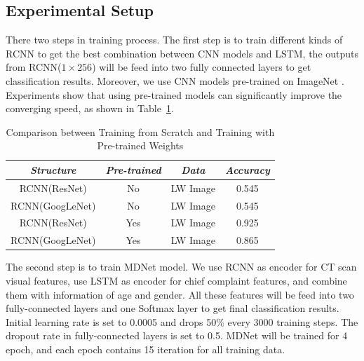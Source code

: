 \documentclass[journal]{IEEEtran}
\begin{document}
\subsection{Experimental Setup}
\label{experimentalsetup}
There two steps in training process.
The first step is to train different kinds of RCNN to get the best combination between CNN models and LSTM, the outputs from RCNN($1 \times 256$) will be feed into two fully connected layers to get classification results. Moreover, we use CNN models pre-trained on ImageNet \cite{ILSVRC15}. Experiments show that using pre-trained models can significantly improve the converging speed, as shown in Table~\ref{pretrain}.
\begin{table}[htb]
    \vspace{-0cm}
    \caption{Comparison between Training from Scratch and Training with Pre-trained Weights}
    \vspace{-0cm}
    \begin{center}
    \begin{tabular}{|c|c|c|c|}
    \hline
    \textbf{\textit{Structure}} & \textbf{\textit{Pre-trained}} & \textbf{\textit{Data}}& \textbf{\textit{Accuracy}}  \\
    \hline
    RCNN(ResNet) &No & LW Image & 0.545\\
    RCNN(GoogLeNet) & No & LW Image & 0.545\\
    RCNN(ResNet) & Yes & LW Image & 0.925\\
    RCNN(GoogLeNet) & Yes & LW Image & 0.865\\
    
    \hline
    \end{tabular}
    \vspace{-0cm}
    \label{pretrain}
    \end{center}
    \vspace{-0cm}
    \end{table}
    
The second step is to train MDNet model. We use RCNN as encoder for CT scan visual features, use LSTM as encoder for chief complaint features, and combine them with information of age and gender. All these features will be feed into two fully-connected layers and one Softmax layer to get final classification results. Initial learning rate is set to 0.0005 and drops 50\% every 3000 training steps. The dropout rate in fully-connected layers is set to 0.5. MDNet will be trained for 4 epoch, and each epoch contains 15 iteration for all training data.
\end{document}
